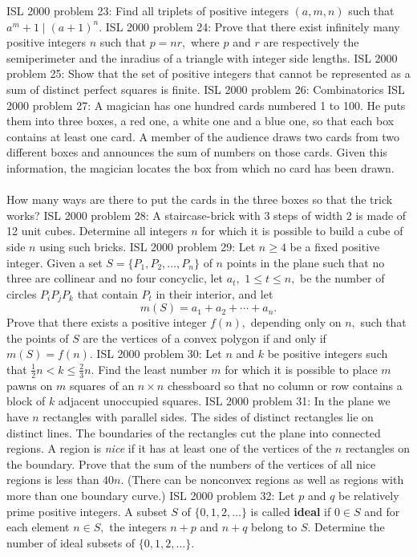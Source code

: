ISL 2000 problem 23:  Find all triplets of positive integers $ (a,m,n)$ such that  $ a^m + 1 \mid (a + 1)^n$. 
ISL 2000 problem 24:  Prove that there exist infinitely many positive integers $ n$ such that $ p = nr,$ where $ p$ and $ r$ are respectively the semiperimeter and the inradius of a triangle with integer side lengths. 
ISL 2000 problem 25:  Show that the set of positive integers that cannot be represented as a sum of distinct perfect squares is finite. 
ISL 2000 problem 26:  Combinatorics 
ISL 2000 problem 27:  A magician has one hundred cards numbered 1 to 100. He puts them into three boxes, a red one, a white one and a blue one, so that each box contains at least one card. A member of the audience draws two cards from two different boxes and announces the sum of numbers on those cards. Given this information, the magician locates the box from which no card has been drawn. \\\\
How many ways are there to put the cards in the three boxes so that the trick works? 
ISL 2000 problem 28:  A staircase-brick with 3 steps of width 2 is made of 12 unit cubes. Determine all integers $ n$ for which it is possible to build a cube of side $ n$ using such bricks. 
ISL 2000 problem 29:  Let $ n \geq 4$ be a fixed positive integer. Given a set $ S = \{P_1, P_2, \ldots, P_n\}$ of $ n$ points in the plane such that no three are collinear and no four concyclic, let $ a_t,$ $ 1 \leq t \leq n,$ be the number of circles $ P_iP_jP_k$ that contain $ P_t$ in their interior, and let
\[ m(S)=a_1+a_2+\cdots + a_n. \]
Prove that there exists a positive integer $ f(n),$ depending only on $ n,$ such that the points of $ S$ are the vertices of a convex polygon if and only if $ m(S) = f(n).$ 
ISL 2000 problem 30:  Let $ n$ and $ k$ be positive integers such that $ \frac{1}{2} n < k \leq \frac{2}{3} n.$ Find the least number $ m$ for which it is possible to place $ m$ pawns on $ m$ squares of an $ n \times n$ chessboard so that no column or row contains a block of $ k$ adjacent unoccupied squares. 
ISL 2000 problem 31:  In the plane we have $n$ rectangles with parallel sides.  The sides of distinct rectangles lie on distinct lines.  The boundaries of the rectangles cut the plane into connected regions.  A region is \textit{nice} if it has at least one of the vertices of the $n$ rectangles on the boundary.  Prove that the sum of the numbers of the vertices of all nice regions is less than $40n$.  (There can be nonconvex regions as well as regions with more than one boundary curve.) 
ISL 2000 problem 32:  Let $ p$ and $ q$ be relatively prime positive integers. A subset $ S$ of $ \{0, 1, 2, \ldots \}$ is called \textbf{ideal} if $ 0 \in S$ and for each element $ n \in S,$ the integers $ n + p$ and $ n + q$ belong to $ S.$ Determine the number of ideal subsets of $ \{0, 1, 2, \ldots \}.$ 


